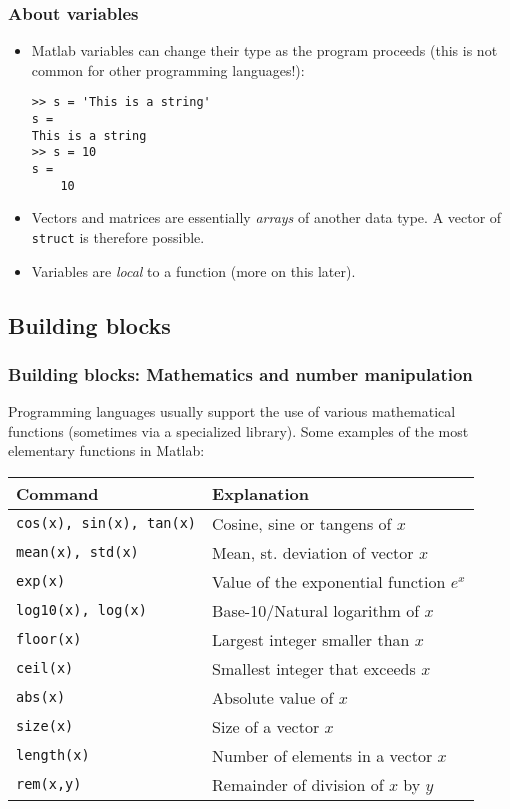 \documentclass[11pt,table,final,fleqn,xcolor={usenames,dvipsnames}]{beamer}
\begin{document}
\begin{frame}[fragile]
 \frametitle{About variables}
 \begin{itemize}
   \item Matlab variables can change their type as the program proceeds (this is not common for other programming languages!):
   \begin{lstlisting}
>> s = 'This is a string'
s =
This is a string
>> s = 10
s =
    10
\end{lstlisting}
    \item Vectors and matrices are essentially \emph{arrays} of another data type. A vector of \lstinline$struct$ is therefore possible.
    \item Variables are \emph{local} to a function (more on this later).
\end{itemize}
\end{frame}

\subsection*{Building blocks}
\begin{frame}
 \frametitle{Building blocks: Mathematics and number manipulation}
 Programming languages usually support the use of various mathematical functions (sometimes via a specialized library). Some examples of the most elementary functions in Matlab:
    \begin{longtable}{l!{\vrule}l}
      Command        & Explanation \\ \hline
      \texttt{cos(x), sin(x), tan(x)} & Cosine, sine or tangens of $x$ \\
      \texttt{mean(x), std(x)} & Mean, st. deviation of vector $x$ \\
      \texttt{exp(x)} & Value of the exponential function $e^x$ \\
      \texttt{log10(x), log(x)} & Base-10/Natural logarithm of $x$ \\
      \texttt{floor(x)} & Largest integer smaller than $x$ \\
      \texttt{ceil(x)} & Smallest integer that exceeds $x$ \\
      \texttt{abs(x)} & Absolute value of $x$ \\
      \texttt{size(x)} & Size of a vector $x$ \\
      \texttt{length(x)} & Number of elements in a vector $x$ \\
      \texttt{rem(x,y)} & Remainder of division of $x$ by $y$\\
    \end{longtable}
\end{frame}
\end{document}
